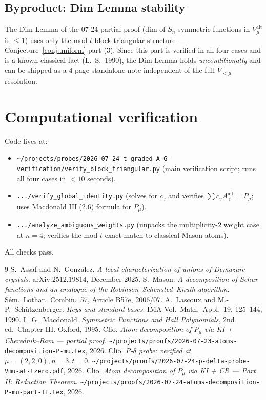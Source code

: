 \documentclass[11pt]{article}
\theoremstyle{definition}
\theoremstyle{remark}
\newcommand{\Aalt}{A^{\mathrm{alt}}}
\begin{document}
\subsection{Byproduct: Dim Lemma stability}

The Dim Lemma of the 07-24 partial proof (dim of $S_n$-symmetric
functions in $V_\mu^{\mathrm{alt}}$ is $\leq 1$) uses only the
mod-$t$ block-triangular structure --- Conjecture~\ref{conj:uniform}
part (3). Since this part is verified in all four cases and is a known
classical fact (L.--S.\ 1990), the Dim Lemma holds \emph{unconditionally}
and can be shipped as a $4$-page standalone note independent of the
full $V_{<\mu}$ resolution.

\section{Computational verification}

Code lives at:
\begin{itemize}
   \item \texttt{\textasciitilde/projects/probes/2026-07-24-t-graded-A-G-verification/verify\_block\_triangular.py}
        (main verification script; runs all four cases in $<10$ seconds).
   \item \texttt{.../verify\_global\_identity.py} (solves for $c_\gamma$
        and verifies $\sum c_\gamma \Aalt_\gamma = P_\mu$; uses
        Macdonald III.(2.6) formula for $P_\mu$).
   \item \texttt{.../analyze\_ambiguous\_weights.py} (unpacks the
        multiplicity-$2$ weight case at $n=4$; verifies the mod-$t$
        exact match to classical Mason atoms).
\end{itemize}
All checks pass.

\begin{thebibliography}{9}
S.\ Assaf and N.\ Gonz\'alez.
\emph{A local characterization of unions of Demazure crystals}.
arXiv:2512.19814, December 2025.
S.\ Mason.
\emph{A decomposition of Schur functions and an analogue of the
Robinson--Schensted--Knuth algorithm}.
S\'em.\ Lothar.\ Combin.\ 57, Article B57e, 2006/07.
A.\ Lascoux and M.-P.\ Sch\"utzenberger.
\emph{Keys and standard bases}.
IMA Vol.\ Math.\ Appl.\ 19, 125--144, 1990.
I.\ G.\ Macdonald.
\emph{Symmetric Functions and Hall Polynomials}, 2nd ed.\ Chapter III.
Oxford, 1995.
Clio.
\emph{Atom decomposition of $P_\mu$ via KI + Cherednik--Ram --- partial proof}.
\texttt{\textasciitilde/projects/proofs/2026-07-23-atoms-decomposition-P-mu.tex}, 2026.
Clio.
\emph{P-$\delta$ probe: verified at $\mu=(2,2,0), n=3, t=0$}.
\texttt{\textasciitilde/projects/proofs/2026-07-24-p-delta-probe-Vmu-at-tzero.pdf}, 2026.
Clio.
\emph{Atom decomposition of $P_\mu$ via KI + CR --- Part II: Reduction Theorem}.
\texttt{\textasciitilde/projects/proofs/2026-07-24-atoms-decomposition-P-mu-part-II.tex}, 2026.
\end{thebibliography}
\end{document}
